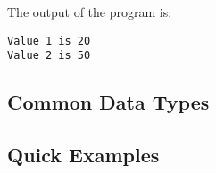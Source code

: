 \documentclass[12pt]{article}
\begin{document}
The output of the program is:

\begin{verbatim}
Value 1 is 20
Value 2 is 50
\end{verbatim}

\subsection*{Common Data Types}






\subsection*{Quick Examples}
\end{document}
